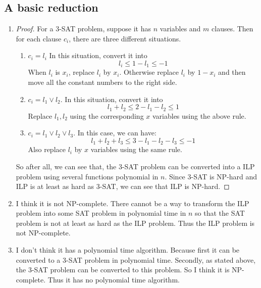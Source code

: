 \documentclass{article}
\begin{document}
\begin{enumerate}
	\section{A basic reduction}
		\begin{enumerate}
			\item \begin{proof}
				For a 3-SAT problem, suppose it has $n$ variables and $m$ clauses. Then for each clause $c_i$, there are three different situations.\begin{enumerate}
				\item $c_i = l_i$ In this situation, convert it into \begin{equation}
					l_i \leq 1
					-l_1 \leq -1
				\end{equation}
				When $l_i$ is $x_i$, replace $l_i$ by $x_i$. Otherwise replace $l_i$ by $1 - x_i$ and then move all the constant numbers to the right side.
				\item $c_i = l_1 \vee l_2$. In this situation, convert it into \begin{equation}
					l_1 + l_2 \leq 2
					-l_1 - l_2 \leq 1
				\end{equation}
				Replace $l_1,l_2$ using the corresponding $x$ variables using the above rule.
				\item $c_i = l_1 \vee l_2 \vee l_3$. In this case, we can have:
				\begin{equation}
					l_1 + l_2 + l_3 \leq 3
					-l_1 - l_2 - l_3 \leq -1
				\end{equation}
				Also replace $l_i$ by $x$ variables using the same rule. \newline
				\end{enumerate}
				So after all, we can see that, the 3-SAT problem can be converted into a ILP problem using several functions polynomial in $n$. Since 3-SAT is NP-hard and ILP is at least as hard as 3-SAT, we can see that ILP is NP-hard.
				\end{proof}
			\item I think it is not NP-complete. There cannot be a way to transform the ILP problem into some SAT problem in polynomial time in $n$ so that the SAT problem is not at least as hard as the ILP problem. Thus the ILP problem is not NP-complete.
			\item I don't think it has a polynomial time algorithm. Because first it can be converted to a 3-SAT problem in polynomial time. Secondly, as stated above, the 3-SAT problem can be converted to this problem. So I think it is NP-complete. Thus it has no polynomial time algorithm.
		\end{enumerate}


\end{enumerate}
\end{document}
